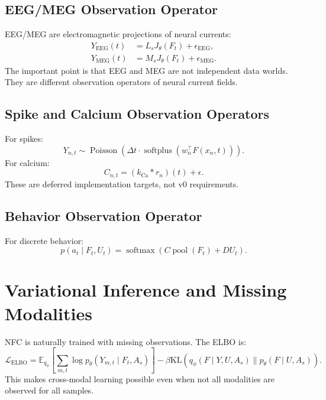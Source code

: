 \documentclass[11pt]{article}
\newcommand{\E}{\mathbb{E}}
\newcommand{\KL}{\mathrm{KL}}
\newcommand{\softmax}{\operatorname{softmax}}
\newcommand{\Poisson}{\operatorname{Poisson}}
\begin{document}
\subsection{EEG/MEG Observation Operator}

EEG/MEG are electromagnetic projections of neural currents:
\begin{align}
Y_{\mathrm{EEG}}(t)&=L_sJ_\theta(F_t)+\epsilon_{\mathrm{EEG}},\\
Y_{\mathrm{MEG}}(t)&=M_sJ_\theta(F_t)+\epsilon_{\mathrm{MEG}}.
\end{align}
The important point is that EEG and MEG are not independent data worlds. They are different observation operators of neural current fields.

\subsection{Spike and Calcium Observation Operators}

For spikes:
\begin{equation}
Y_{n,t}\sim \Poisson\left(\Delta t\cdot \operatorname{softplus}(w_n^\top F(x_n,t))\right).
\end{equation}
For calcium:
\begin{equation}
C_{n,t}=(k_{\mathrm{Ca}}*r_n)(t)+\epsilon.
\end{equation}
These are deferred implementation targets, not v0 requirements.

\subsection{Behavior Observation Operator}

For discrete behavior:
\begin{equation}
p(a_t\mid F_t,U_t)=\softmax\left(C\operatorname{pool}(F_t)+DU_t\right).
\end{equation}

\section{Variational Inference and Missing Modalities}

NFC is naturally trained with missing observations. The ELBO is:
\begin{equation}
\mathcal{L}_{\mathrm{ELBO}}
=\E_{q_\phi}\left[\sum_{m,t}\log p_\theta(Y_{m,t}\mid F_t,A_s)\right]
-\beta\KL\left(q_\phi(F\mid Y,U,A_s)\|p_\theta(F\mid U,A_s)\right).
\end{equation}
This makes cross-modal learning possible even when not all modalities are observed for all samples.
\end{document}
